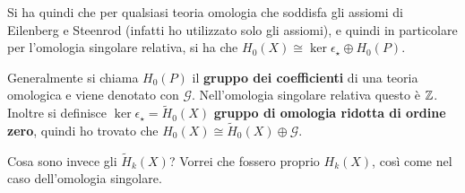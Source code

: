 Si ha quindi che per qualsiasi teoria omologia che soddisfa gli assiomi di
Eilenberg e Steenrod (infatti ho utilizzato solo gli assiomi), e quindi in
particolare per l'omologia singolare relativa, si ha che
$ H_0(X) \cong \ker{\epsilon_\star} \oplus H_0(P) $.

Generalmente si chiama $ H_0(P) $ il \textbf{gruppo dei coefficienti}
di una teoria omologica e viene denotato con $ \mathcal{G} $. Nell'omologia singolare relativa questo è $ \mathbb{Z} $.
Inoltre si definisce $ \ker{\epsilon_\star} = \tilde{H}_0(X) $ \textbf{gruppo di omologia ridotta di ordine zero}, quindi
ho trovato che $ H_0(X) \cong \tilde{H}_0(X) \oplus \mathcal{G} $.

Cosa sono invece gli $ \tilde{H}_k(X) $? Vorrei che fossero proprio $ H_k(X) $,
così come nel caso dell'omologia singolare.

